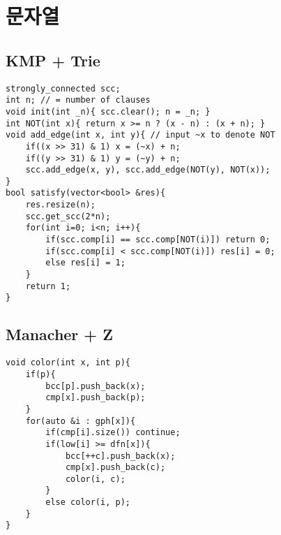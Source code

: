 \documentclass[landscape, 8pt, a4paper, oneside, twocolumn]{extarticle}
\begin{document}
\section{문자열}
\subsection {KMP + Trie}
\begin{verbatim}
strongly_connected scc;
int n; // = number of clauses
void init(int _n){ scc.clear(); n = _n; }
int NOT(int x){ return x >= n ? (x - n) : (x + n); }
void add_edge(int x, int y){ // input ~x to denote NOT
	if((x >> 31) & 1) x = (~x) + n;
	if((y >> 31) & 1) y = (~y) + n;
	scc.add_edge(x, y), scc.add_edge(NOT(y), NOT(x));
}
bool satisfy(vector<bool> &res){
	res.resize(n);
	scc.get_scc(2*n);
	for(int i=0; i<n; i++){
		if(scc.comp[i] == scc.comp[NOT(i)]) return 0;
		if(scc.comp[i] < scc.comp[NOT(i)]) res[i] = 0;
		else res[i] = 1;
	}
	return 1;
}
\end{verbatim}
\subsection {Manacher + Z}
\begin{verbatim}
void color(int x, int p){
	if(p){
		bcc[p].push_back(x);
		cmp[x].push_back(p);
	}
	for(auto &i : gph[x]){
		if(cmp[i].size()) continue;
		if(low[i] >= dfn[x]){
			bcc[++c].push_back(x);
			cmp[x].push_back(c);
			color(i, c);
		}
		else color(i, p);
	}
}
\end{verbatim}
\end{document}
